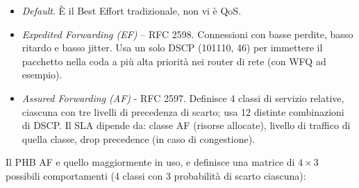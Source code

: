 \begin{itemize}
	\item \textit{Default}. È il Best Effort tradizionale, non vi è QoS.
	\item \textit{Expedited Forwarding (EF)} -- RFC 2598. Connessioni con basse perdite, basso ritardo e basso jitter. Usa un solo DSCP (101110, 46) per immettere il pacchetto nella coda a più alta priorità nei router di rete (con WFQ ad esempio).
	\item \textit{Assured Forwarding (AF)} - RFC 2597. Definisce 4 classi di servizio relative, ciascuna con tre livelli di precedenza di scarto; usa 12 distinte combinazioni di DSCP. Il SLA dipende da: classe AF (risorse allocate), livello di traffico di quella classe, drop precedence (in caso di congestione).
\end{itemize}
Il PHB AF e quello maggiormente in uso, e definisce una matrice di $4\times 3$ possibili comportamenti (4 classi con 3 probabilità di scarto ciascuna):

